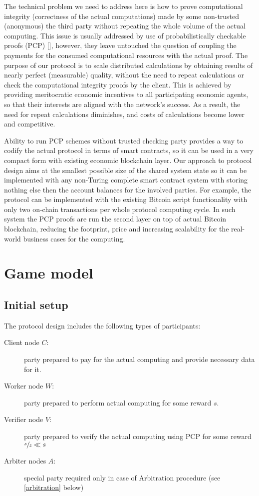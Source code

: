 \documentclass{article}
\begin{document}
The technical problem we need to address here is how to prove computational integrity (correctness of the actual computations) made by some non-trusted (anonymous) the third party without repeating the whole volume of the actual computing. This issue is usually addressed by use of probabilistically checkable proofs (PCP) [], however, they leave untouched the question of coupling the payments for the consumed computational resources with the actual proof. The purpose of our protocol is to scale distributed calculations by obtaining results of nearly perfect (measurable) quality, without the need to repeat calculations or check the computational integrity proofs by the client. This is achieved by providing meritocratic economic incentives to all participating economic agents, so that their interests are aligned with the network's success. As a result, the need for repeat calculations diminishes, and costs of calculations become lower and competitive.

Ability to run PCP schemes without trusted checking party provides a way to codify the actual protocol in terms of smart contracts, so it can be used in a very compact form with existing economic blockchain layer. Our approach to protocol design aims at the smallest possible size of the shared system state so it can be implemented with any non-Turing complete smart contract system with storing nothing else then the account balances for the involved parties. For example, the protocol can be implemented with the existing Bitcoin script functionality with only two on-chain transactions per whole protocol computing cycle. In such system the PCP proofs are run the second layer on top of actual Bitcoin blockchain, reducing the footprint, price and increasing scalability for the real-world business cases for the computing. 


\section{Game model}
\label{gamemodel}

\subsection{Initial setup}
\label{setup}

The protocol design includes the following types of participants:
\begin{description}
    \item[Client node $C$:] party prepared to pay for the actual computing and provide necessary data for it.
    \item[Worker node $W$:] party prepared to perform actual computing for some reward $s$.
    \item[Verifier node $V$:] party prepared to verify the actual computing using PCP for some reward $\sfrac{s}{z} \ll s$
    \item[Arbiter nodes $A$:] special party required only in case of \Gls{Arbitration} procedure (see \ref{arbitration} below)
\end{description}
\end{document}
